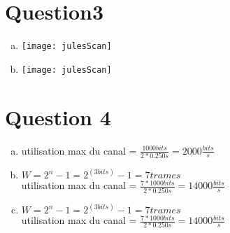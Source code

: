 \section{Question3}

\begin{enumerate}[(a)]
	\item
		\parbox{\linewidth}{\centering
		\texttt{[image: julesScan]}
		}
	\item
		\parbox{\linewidth}{\centering
		\texttt{[image: julesScan]}
		}
\end{enumerate}


\section{Question 4}
\begin{enumerate}[(a)]
	\item 
		utilisation max du canal = $\frac{1000 bits}{2 * 0.250s} = 2000\frac{bits}{s}$
	\item
		$W = 2^n-1 = 2^(3bits)-1 = 7 trames$\\
		utilisation max du canal = $\frac{7 * 1000 bits}{2 * 0.250s} = 14000\frac{bits}{s}$
	\item
		$W = 2^n-1 = 2^(3bits)-1 = 7 trames$\\
		utilisation max du canal = $\frac{7 * 1000 bits}{2 * 0.250s} = 14000\frac{bits}{s}$
\end{enumerate}

